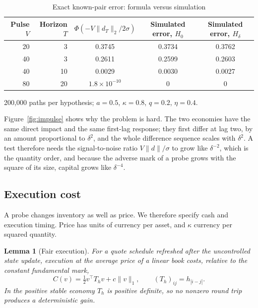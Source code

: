 \documentclass[12pt]{article}
\newtheorem{lemma}[theorem]{Lemma}
\theoremstyle{definition}
\theoremstyle{remark}
\begin{document}
\begin{table}[t]\centering
\begin{threeparttable}
\caption{Exact known-pair error: formula versus simulation}\label{tab:mcerr}
\begin{tabular}{rrccc}
\toprule
Pulse $V$ & Horizon $T$ & $\Phi(-V\|d_T\|_2/2\sigma)$ & Simulated error, $H_0$ & Simulated error, $H_\delta$\\
\midrule
20 & 3 & 0.3745 & 0.3734 & 0.3762\\
40 & 3 & 0.2611 & 0.2599 & 0.2603\\
40 & 10 & 0.0029 & 0.0030 & 0.0027\\
80 & 20 & $1.8\times10^{-10}$ & 0 & 0\\
\bottomrule
\end{tabular}
\begin{tablenotes}\footnotesize\item 200,000 paths per hypothesis; $a=0.5$, $\kappa=0.8$, $q=0.2$, $\eta=0.4$. \end{tablenotes}
\end{threeparttable}
\end{table}

Figure~\ref{fig:impulse} shows why the problem is hard. The two economies have the same direct impact and the same first-lag response; they first differ at lag two, by an amount proportional to $\delta^2$, and the whole difference sequence scales with $\delta^2$. A test therefore needs the signal-to-noise ratio $V\|d\|/\sigma$ to grow like $\delta^{-2}$, which is the quantity order, and because the adverse mark of a probe grows with the square of its size, capital grows like $\delta^{-4}$.

\subsection{Execution cost}

A probe changes inventory as well as price. We therefore specify cash and execution timing. Price has units of currency per asset, and $\kappa$ currency per squared quantity.

\begin{lemma}[Fair execution]\label{lem:toeplitz}
For a quote schedule refreshed after the uncontrolled state update, execution at the average price of a linear book costs, relative to the constant fundamental mark,
\begin{equation}\label{eq:cost}
C(v)=\tfrac12v^\top T_hv+c\|v\|_1,\qquad (T_h)_{ij}=h_{|i-j|}.
\end{equation}
In the positive stable economy $T_h$ is positive definite, so no nonzero round trip produces a deterministic gain.
\end{lemma}
\end{document}
